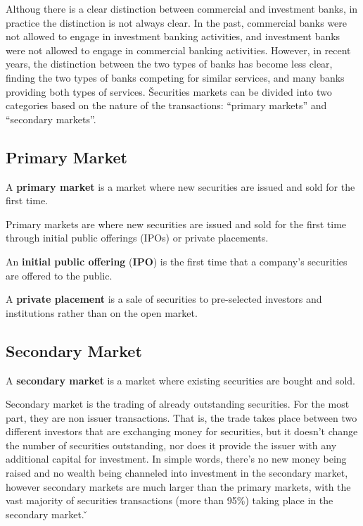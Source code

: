 Althoug there is a clear distinction between commercial and investment banks, in practice the distinction is not always
clear. In the past, commercial banks were not allowed to engage in investment banking activities, and investment banks
were not allowed to engage in commercial banking activities. However, in recent years, the distinction between the two
types of banks has become less clear, finding the two types of banks competing for similar services, and many banks
providing both types of services. \v

Securities markets can be divided into two categories based on the nature of the transactions: ``primary markets'' and
``secondary markets''.

\subsection{Primary Market}

A \textbf{primary market} is a market where new securities are issued and sold for the first time.
\ed

Primary markets are where new securities are issued and sold for the first time through initial public offerings (IPOs)
or private placements.

An \textbf{initial public offering} (\textbf{IPO}) is the first time that a company's securities are offered to the
public.
\ed

A \textbf{private placement} is a sale of securities to pre-selected investors and institutions rather than on the
open market.
\ed

\subsection{Secondary Market}

A \textbf{secondary market} is a market where existing securities are bought and sold.
\ed

Secondary market is the trading of already outstanding securities. For the most part, they are non issuer
transactions. That is, the trade takes place between two different investors that are exchanging money for securities,
but it doesn't change the number of securities outstanding, nor does it provide the issuer with any additional
capital for investment. In simple words, there's no new money being raised and no wealth being channeled into
investment in the secondary market, however secondary markets are much larger than the primary markets, with the vast
majority of securities transactions (more than 95\%) taking place in the secondary market. \v

